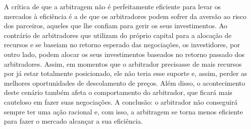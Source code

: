 A crítica de que a arbitragem não é perfeitamente eficiente para levar os mercados à eficiência é a de que os arbitradores podem sofrer da aversão ao risco dos parceiros, aqueles que lhe confiam para gerir os seus investimentos. Ao contrário de arbitradores que utilizam do próprio capital para a alocação de recursos e se baseiam no retorno esperado das negociações, os investidores, por outro lado, podem alocar os seus investimentos baseados no retorno passado dos arbitradores. Assim, em momentos que o arbitrador precisasse de mais recursos por já estar totalmente posicionado, ele não teria esse suporte e, assim, perder as melhores oportunidades de descolamento de preços. Além disso, o acontecimento deste cenário também afeta o comportamento do arbitrador, que ficará mais cauteloso em fazer suas negociações. A conclusão: o arbitrador não conseguirá sempre ter uma ação racional e, com isso, a arbitragem se torna menos eficiente para fazer o mercado alcançar a sua eficiência.

